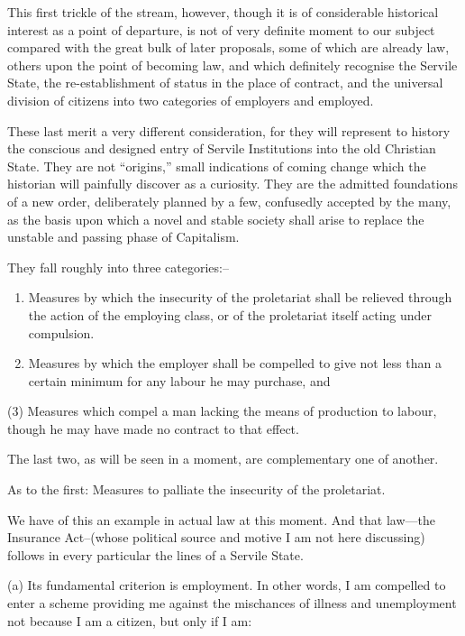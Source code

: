 \documentclass{book}
\begin{document}
This first trickle of the stream, however, though it is of considerable historical interest as a point of departure, is not of very definite moment to our subject compared with the great bulk of later proposals, some of which are already law, others upon the point of becoming law, and which definitely recognise the Servile State, the re-establishment of status in the place of contract, and the universal division of citizens into two categories of employers and employed.

These last merit a very different consideration, for they will represent to history the conscious and designed entry of Servile Institutions into the old Christian State. They are not “origins,” small indications of coming change which the historian will painfully discover as a curiosity. They are the admitted foundations of a new order, deliberately planned by a few, confusedly accepted by the many, as the basis upon which a novel and stable society shall arise to replace the unstable and passing phase of Capitalism.

They fall roughly into three categories:–

\begin{enumerate}
	\item Measures by which the insecurity of the proletariat shall be relieved through the action of the employing class, or of the proletariat itself acting under compulsion.


	\item Measures by which the employer shall be compelled to give not less than a certain minimum for any labour he may purchase, and



\end{enumerate}
(3) Measures which compel a man lacking the means of production to labour, though he may have made no contract to that effect.

The last two, as will be seen in a moment, are complementary one of another.

As to the first: Measures to palliate the insecurity of the proletariat.

We have of this an example in actual law at this moment. And that law—the Insurance Act–(whose political source and motive I am not here discussing) follows in every particular the lines of a Servile State.

(a) Its fundamental criterion is employment. In other words, I am compelled to enter a scheme providing me against the mischances of illness and unemployment not because I am a citizen, but only if I am:
\end{document}
